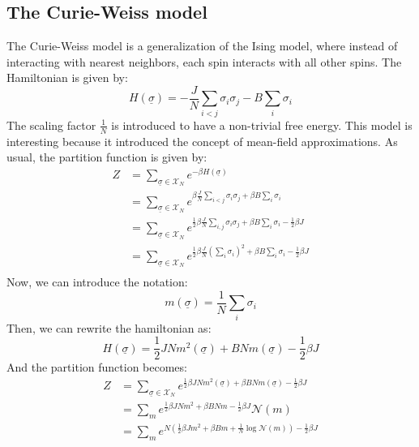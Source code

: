 \subsection{The Curie-Weiss model}
\label{sec:curie_weiss}
The Curie-Weiss model is a generalization of the Ising model, where instead of interacting with nearest neighbors, each spin interacts with all other spins. The Hamiltonian is given by:
\begin{equation}
    H(\underline{\sigma}) = -\frac{J}{N}\sum_{i<j}\sigma_i\sigma_j - B\sum_i \sigma_i
\end{equation}
The scaling factor $\frac{1}{N}$ is introduced to have a non-trivial free energy. This model is interesting because it introduced the concept of mean-field approximations. As usual, the partition function is given by:
\begin{equation}
    \begin{aligned}
        Z &= \sum_{\underline{\sigma}\in\mathcal{X}_N}e^{-\beta H(\underline{\sigma})}\\
        &= \sum_{\underline{\sigma}\in\mathcal{X}_N}e^{\beta\frac{J}{N}\sum_{i<j}\sigma_i\sigma_j+\beta B \sum_i \sigma_i}\\
        &= \sum_{\underline{\sigma}\in\mathcal{X}_N}e^{\frac{1}{2}\beta\frac{J}{N}\sum_{i,j}\sigma_i\sigma_j+\beta B \sum_i \sigma_i-\frac{1}{2}\beta J}\\
        &= \sum_{\underline{\sigma}\in\mathcal{X}_N}e^{\frac{1}{2}\beta\frac{J}{N}\left(\sum_{i}\sigma_i\right)^2+\beta B \sum_i \sigma_i-\frac{1}{2}\beta J}\\
    \end{aligned}
\end{equation}
Now, we can introduce the notation:
\begin{equation}
m(\underline{\sigma}) = \frac{1}{N}\sum_{i}\sigma_i
\end{equation}
Then, we can rewrite the hamiltonian as:
\begin{equation}
    H(\underline{\sigma}) = \frac{1}{2} J N m^2(\underline{\sigma}) + B N m(\underline{\sigma}) - \frac{1}{2}\beta J
\end{equation}
And the partition function becomes:
\begin{equation}
    \begin{aligned}
        Z &= \sum_{\underline{\sigma}\in\mathcal{X}_N}e^{\frac{1}{2}\beta J N m^2(\underline{\sigma}) + \beta B N m(\underline{\sigma})-\frac{1}{2}\beta J}\\
        &= \sum_{m}e^{\frac{1}{2}\beta J N m^2 + \beta B N m-\frac{1}{2}\beta J}\mathcal{N}(m)\\
        &= \sum_{m}e^{N\left(\frac{1}{2}\beta J m^2 + \beta B m + \frac{1}{N}\log\mathcal{N}(m)\right)-\frac{1}{2}\beta J}
    \end{aligned}
\end{equation}
